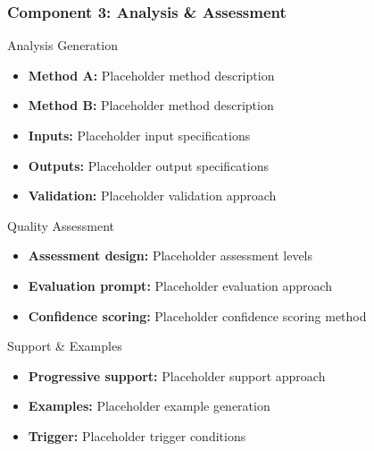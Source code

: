 \begin{frame}
\frametitle{Component 3: Analysis \& Assessment}
\begin{block}{Analysis Generation}
\begin{itemize}
\item \textbf{Method A:} Placeholder method description
\item \textbf{Method B:} Placeholder method description
\item \textbf{Inputs:} Placeholder input specifications
\item \textbf{Outputs:} Placeholder output specifications
\item \textbf{Validation:} Placeholder validation approach
\end{itemize}
\end{block}

\begin{block}{Quality Assessment}
\begin{itemize}
\item \textbf{Assessment design:} Placeholder assessment levels
\item \textbf{Evaluation prompt:} Placeholder evaluation approach
\item \textbf{Confidence scoring:} Placeholder confidence scoring method
\end{itemize}
\end{block}

\begin{block}{Support \& Examples}
\begin{itemize}
\item \textbf{Progressive support:} Placeholder support approach
\item \textbf{Examples:} Placeholder example generation
\item \textbf{Trigger:} Placeholder trigger conditions
\end{itemize}
\end{block}
\end{frame}

